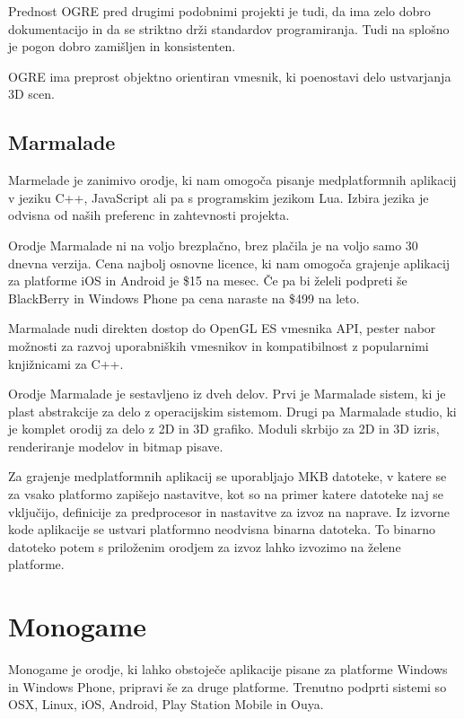 Prednost OGRE pred drugimi podobnimi projekti je tudi, da ima zelo dobro dokumentacijo in da se striktno drži standardov programiranja. Tudi na splošno je pogon dobro zamišljen in konsistenten.

OGRE ima preprost objektno orientiran vmesnik, ki poenostavi delo ustvarjanja 3D scen.

\subsection{Marmalade}
\label{sec:marmalade}
Marmelade \cite{marmalade} je zanimivo orodje, ki nam omogoča pisanje medplatformnih aplikacij v jeziku C++, JavaScript ali pa s programskim jezikom Lua. Izbira jezika je odvisna od naših preferenc in zahtevnosti projekta.

Orodje Marmalade ni na voljo brezplačno, brez plačila je na voljo samo 30 dnevna verzija. Cena najbolj osnovne licence, ki nam omogoča grajenje aplikacij za platforme iOS in Android je \$15 na mesec. Če pa bi želeli podpreti še BlackBerry in Windows Phone pa cena naraste na \$499 na leto.

Marmalade nudi direkten dostop do OpenGL ES vmesnika API, pester nabor možnosti za razvoj uporabniških vmesnikov in kompatibilnost z popularnimi knjižnicami za C++. 

Orodje Marmalade je sestavljeno iz dveh delov. Prvi je Marmalade sistem, ki je plast abstrakcije za delo z operacijskim sistemom. Drugi pa Marmalade studio, ki je komplet orodij za delo z 2D in 3D grafiko. Moduli skrbijo za 2D in 3D izris, renderiranje modelov in bitmap pisave.

Za grajenje medplatformnih aplikacij se uporabljajo MKB datoteke, v katere se za vsako platformo zapišejo nastavitve, kot so na primer katere datoteke naj se vključijo, definicije za predprocesor in nastavitve za izvoz na naprave. Iz izvorne kode aplikacije se ustvari platformno neodvisna binarna datoteka. To binarno datoteko potem s priloženim orodjem za izvoz lahko izvozimo na želene platforme.

\section{Monogame}

Monogame je orodje, ki lahko obstoječe aplikacije pisane za platforme Windows in Windows Phone, pripravi še za druge platforme. Trenutno podprti sistemi so OSX, Linux, iOS, Android, Play Station Mobile in Ouya. 

